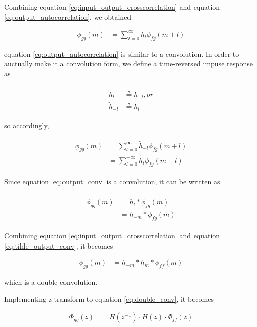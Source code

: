 \documentclass[8pt,a4paper]{article}
\begin{document}
\begin{multicols}{2}
Combining equation \ref{eq:input_output_crosscorrelation} and equation \ref{eq:output_autocorrelation}, we obtained

\begin{align}
  \label{eq:output_autocorrelation_2}
  \phi_{gg}(m) &= \sum_{l=0}^{\infty} h_{l} \phi_{fg}(m+l)
\end{align}

equation \ref{eq:output_autocorrelation} is similar to a convolution. In order to auctually make it a convolution form, we define a time-reversed impuse response as

\begin{align}
  \begin{split}
  \tilde{h}_{l} &\triangleq h_{-l}, or \\
  \tilde{h}_{-l} &\triangleq h_{l}
  \end{split}
\end{align}

so accordingly, 

\begin{align}
  \label{eq:output_conv}
  \begin{split}
    \phi_{gg}(m) &= \sum_{l=0}^{\infty} \tilde{h}_{-l} \phi_{fg}(m+l) \\
    &= \sum_{l=0}^{-\infty} \tilde{h}_{l} \phi_{fg}(m-l)
  \end{split}
\end{align}

Since equation \ref{eq:output_conv} is a convolution, it can be written as

\begin{align}
  \label{eq:tilde_output_conv}
  \begin{split}
    \phi_{gg}(m) &= \tilde{h}_{l} * \phi_{fg}(m) \\
    &= h_{-m} * \phi_{fg}(m)
  \end{split}
\end{align}


Combining equation \ref{eq:input_output_crosscorrelation} and equation \ref{eq:tilde_output_conv}, it becomes 

\begin{align}
  \label{eq:double_conv}
  \phi_{gg}(m) &= h_{-m} * h_{m} * \phi_{ff}(m)
\end{align}

which is a double convolution.

Implementing z-transform to equation \ref{eq:double_conv}, it becomes

\begin{align}
  \Phi_{gg}(z) &= H(z^{-1}) \cdot H(z) \cdot \Phi_{ff}(z)
\end{align}



\end{multicols}
\end{document}
